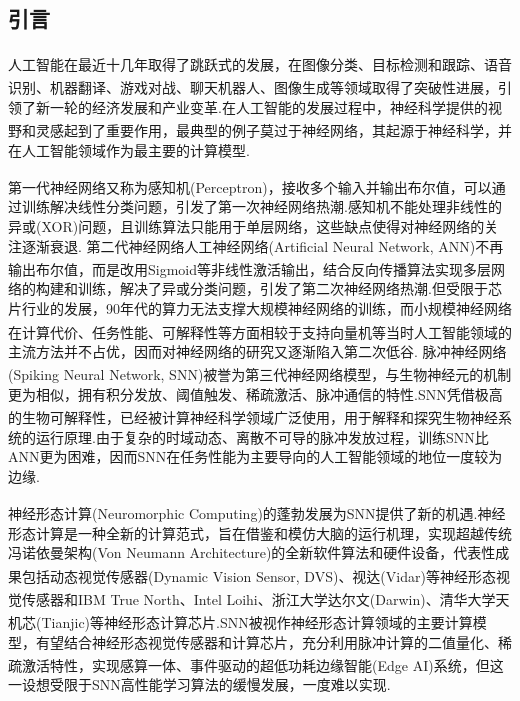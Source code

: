 \documentclass[10.5pt,compsoc,UTF8]{CjC}
\theoremstyle{mystyle}
\newcommand{\upcite}[1]{\textsuperscript{\cite{#1}}}
\begin{document}
\vskip 1mm
\begin{multicols}{1}

\section{引言}
人工智能在最近十几年取得了跳跃式的发展\upcite{deep-learning-nature}，在图像分类\upcite{he2015delving, szegedy2015going, he2016deep, dosovitskiy2020image}、目标检测和跟踪\upcite{girshick2014rich, redmon2016you}、语音识别\upcite{graves2013speech, graves2013hybrid}、机器翻译\upcite{sutskever2014sequence, bahdanau2014neural, sennrich2015neural}、游戏对战\upcite{mnih2015human, silver2017mastering}、聊天机器人\upcite{NEURIPS2020_1457c0d6, zeng2021pangualphalargescaleautoregressivepretrained, openai2024gpt4technicalreport}、图像生成\upcite{NIPS2014_5ca3e9b1, DBLP:journals/corr/RadfordMC15, Rombach_2022_CVPR}等领域取得了突破性进展，引领了新一轮的经济发展和产业变革.在人工智能的发展过程中，神经科学提供的视野和灵感起到了重要作用\upcite{hassabis2017neuroscience, Zador2023}，最典型的例子莫过于神经网络，其起源于神经科学，并在人工智能领域作为最主要的计算模型.

第一代神经网络又称为感知机(Perceptron)\upcite{rosenblatt1958perceptron}，接收多个输入并输出布尔值，可以通过训练解决线性分类问题，引发了第一次神经网络热潮.感知机不能处理非线性的异或(XOR)问题，且训练算法只能用于单层网络，这些缺点使得对神经网络的关注逐渐衰退.
第二代神经网络人工神经网络(Artificial Neural Network, ANN)不再输出布尔值，而是改用Sigmoid等非线性激活输出，结合反向传播算法\upcite{rumelhart1986learning}实现多层网络的构建和训练，解决了异或分类问题，引发了第二次神经网络热潮.但受限于芯片行业的发展，90年代的算力无法支撑大规模神经网络的训练，而小规模神经网络在计算代价、任务性能、可解释性等方面相较于支持向量机\upcite{cortes1995support}等当时人工智能领域的主流方法并不占优，因而对神经网络的研究又逐渐陷入第二次低谷.
脉冲神经网络(Spiking Neural Network, SNN)被誉为第三代神经网络模型\upcite{maass1997networks}，与生物神经元的机制更为相似，拥有积分发放、阈值触发、稀疏激活、脉冲通信的特性.SNN凭借极高的生物可解释性，已经被计算神经科学领域广泛使用\upcite{gewaltig2007nest, spaun, Stimberg2019}，用于解释和探究生物神经系统的运行原理.由于复杂的时域动态、离散不可导的脉冲发放过程，训练SNN比ANN更为困难，因而SNN在任务性能为主要导向的人工智能领域的地位一度较为边缘.

神经形态计算(Neuromorphic Computing)\upcite{mead1990neuromorphic, roy2019towards}的蓬勃发展为SNN提供了新的机遇.神经形态计算是一种全新的计算范式，旨在借鉴和模仿大脑的运行机理，实现超越传统冯诺依曼架构(Von Neumann Architecture)的全新软件算法和硬件设备，代表性成果包括动态视觉传感器(Dynamic Vision Sensor, DVS)\upcite{lichtsteiner2008128}、视达(Vidar)\upcite{dong2017spike}等神经形态视觉传感器和IBM True North\upcite{merolla2014million}、Intel Loihi\upcite{loihi}、浙江大学达尔文(Darwin)\upcite{ma2017darwin}、清华大学天机芯(Tianjic)\upcite{pei2019towards}等神经形态计算芯片.SNN被视作神经形态计算领域的主要计算模型，有望结合神经形态视觉传感器和计算芯片，充分利用脉冲计算的二值量化、稀疏激活特性，实现感算一体、事件驱动的超低功耗边缘智能(Edge AI)系统\upcite{roy2019towards}，但这一设想受限于SNN高性能学习算法的缓慢发展，一度难以实现.


\end{multicols}
\end{document}
